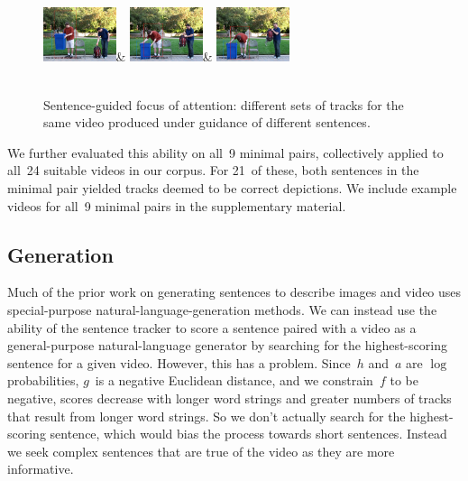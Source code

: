 \begin{figure}
\begin{tabular}
    \includegraphics[width=0.19\textwidth]{images/inference1b-0004}&
    \includegraphics[width=0.19\textwidth]{images/inference1b-0006}&
    \includegraphics[width=0.19\textwidth]{images/inference1b-0008}\\
    \\
  \end{tabular}
  \caption{Sentence-guided focus of attention: different sets of tracks for
    the same video produced under guidance of different sentences.}
  \label{fig-st1:inference}
\end{figure}

We further evaluated this ability on all~9 minimal pairs, collectively applied
to all~24 suitable videos in our corpus.
%
For 21~of these, both sentences in the minimal pair yielded tracks deemed to be
correct depictions.
%
We include example videos for all~9 minimal pairs in the supplementary material.

\subsection{Generation}
\label{subsec:generation}
%
Much of the prior work on generating sentences to describe images
\citep{Jie2009, Farhadi2010, Li2011a, Yang2011, Gupta2012, Mitchell2012} and
video \citep{Kojima2002, Tena2007, Barbu2012a, Khan2012, Wang2012} uses
special-purpose natural-language-generation methods.
%
We can instead use the ability of the sentence tracker to score a sentence
paired with a video as a general-purpose natural-language generator by
searching for the highest-scoring sentence for a given video.
%
However, this has a problem.
%
Since~$h$ and~$a$ are $\log$ probabilities, $g$~is a negative Euclidean
distance, and we constrain~$f$ to be negative, scores decrease with longer word
strings and greater numbers of tracks that result from longer word strings.
%
So we don't actually search for the highest-scoring sentence, which would bias
the process towards short sentences.
%
Instead we seek complex sentences that are true of the video as they are more
informative.

